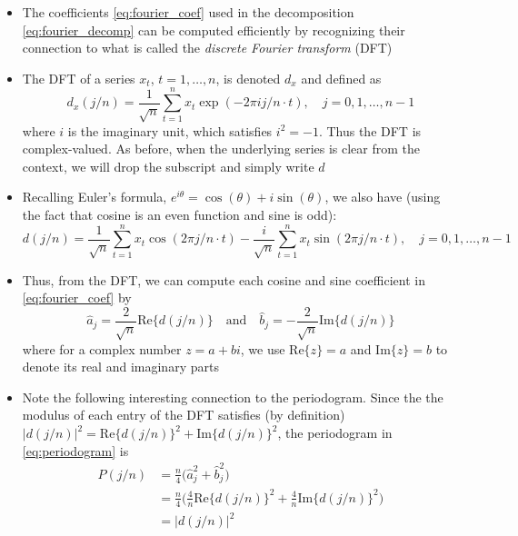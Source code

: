 \documentclass{article}
\begin{document}
\begin{itemize}
\item The coefficients \eqref{eq:fourier_coef} used in the decomposition
  \eqref{eq:fourier_decomp} can be computed efficiently by recognizing their
  connection to what is called the \emph{discrete Fourier transform} (DFT) 

\item The DFT of a series $x_t$, $t = 1,\dots,n$, is denoted $d_x$ and defined
  as  
  \begin{equation}
  \label{eq:dft}
  d_x(j/n) = \frac{1}{\sqrt{n}} \sum_{t=1}^n x_t \exp(-2\pi i j/n \cdot t), 
  \quad j = 0,1,\dots,n-1 
  \end{equation}
  where $i$ is the imaginary unit, which satisfies $i^2 = -1$. Thus the DFT is
  complex-valued. As before, when the underlying series is clear from the
  context, we will drop the subscript and simply write $d$ 

\item Recalling Euler's formula, $e^{i\theta} = \cos(\theta) + i \sin(\theta)$, 
  we also have (using the fact that cosine is an even function and sine is odd): 
  \[
  d(j/n) = \frac{1}{\sqrt{n}} \sum_{t=1}^n x_t \cos(2\pi j/n \cdot t) - 
  \frac{i}{\sqrt{n}} \sum_{t=1}^n x_t \sin(2\pi j/n \cdot t), \quad j =
  0,1,\dots,n-1   
  \]

\item Thus, from the DFT, we can compute each cosine and sine coefficient in
  \eqref{eq:fourier_coef} by
  \[
  \hat{a}_j = \frac{2}{\sqrt{n}} \mathrm{Re}\{d(j/n)\} \quad \text{and} \quad 
  \hat{b}_j = -\frac{2}{\sqrt{n}} \mathrm{Im}\{d(j/n)\}
  \]
  where for a complex number $z = a+bi$, we use $\mathrm{Re}\{z\} = a$ and
  $\mathrm{Im}\{z\} = b$ to denote its real and imaginary parts

\item Note the following interesting connection to the periodogram. Since the
  the modulus of each entry of the DFT satisfies (by definition) $|d(j/n)|^2 = 
  \mathrm{Re}\{d(j/n)\}^2 + \mathrm{Im}\{d(j/n)\}^2$, the periodogram in
  \eqref{eq:periodogram} is 
  \begin{align}
  \nonumber
  P(j/n) &= \frac{n}{4} \big( \hat{a}_j^2 + \hat{b}_j^2 \big) \\
  \nonumber
  &= \frac{n}{4} \bigg( \frac{4}{n} \mathrm{Re}\{d(j/n)\}^2 +
    \frac{4}{n} \mathrm{Im}\{d(j/n)\}^2 \bigg) \\
  \label{eq:periodogram_dft}          
  &= |d(j/n)|^2
  \end{align}


\end{itemize}
\end{document}
